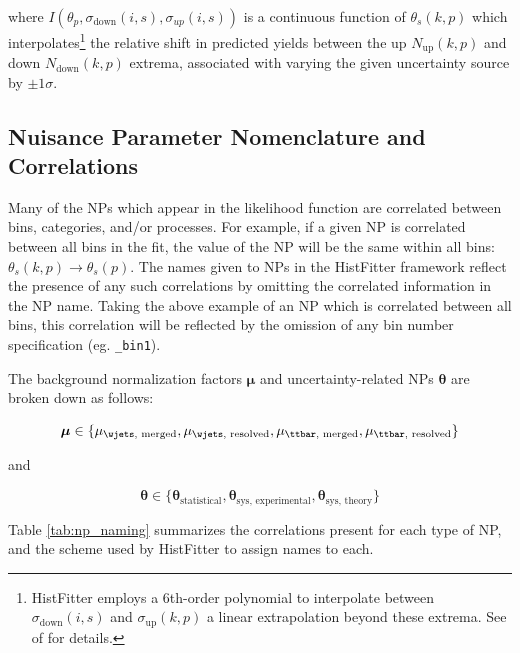         where \(I(\theta_p, \sigma_\text{down}(i,s), \sigma_{up}(i,s))\) is a continuous function of \(\theta_s(k,p)\) which interpolates\footnote{HistFitter employs a 6th-order polynomial to interpolate between  \(\sigma_\text{down}(i,s)\) and \(\sigma_\text{up}(k,p)\) a linear extrapolation beyond these extrema. See  of  for details.} the relative shift in predicted yields between the up \(N_\text{up}(k, p)\) and down \(N_\text{down}(k, p)\) extrema, associated with varying the given uncertainty source by \(\pm1\sigma\). 

\subsection{Nuisance Parameter Nomenclature and Correlations}
\label{sec:np_naming_corr}

Many of the NPs which appear in the likelihood function are correlated between bins, categories, and/or processes. For example, if a given NP is correlated between all bins in the fit, the value of the NP will be the same within all bins: \(\theta_s(k, p) \rightarrow \theta_s(p)\). The names given to NPs in the HistFitter framework reflect the presence of any such correlations by omitting the correlated information in the NP name. Taking the above example of an NP which is correlated between all bins, this correlation will be reflected by the omission of any bin number specification (eg. \verb|_bin1|).

The background normalization factors \(\boldsymbol{\mu}\) and uncertainty-related NPs \(\boldsymbol{\theta}\) are broken down as follows:

\begin{equation}
\label{eq:norm_factor_breakdown}
\boldsymbol{\mu}\in\{\mu_\text{\wjets, merged}, \mu_\text{\wjets, resolved}, \mu_\text{\ttbar, merged}, \mu_\text{\ttbar, resolved}\}
\end{equation}

\noindent and

\begin{equation}
\label{eq:norm_factor_breakdown}
\boldsymbol{\theta}\in\{\boldsymbol{\theta}_\text{statistical}, \boldsymbol{\theta}_\text{sys, experimental}, \boldsymbol{\theta}_\text{sys, theory}\}
\end{equation}

Table \ref{tab:np_naming} summarizes the correlations present for each type of NP, and the scheme used by HistFitter to assign names to each.

